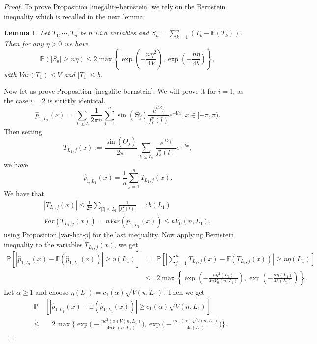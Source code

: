 \documentclass[11pt,a4paper,openany]{article}
\newtheorem{lem}[thm]{Lemma}
\def\E{\mathbb{E}}
\def \compi{\mathrm{i}}
\begin{document}
\begin{proof}
  To prove Proposition \ref{inegalite-bernstein} we rely on the Bernstein inequality which is recalled in the next lemma. 
 \begin{lem}
 \label{lemma:Berstein.inequality}
 Let $T_1, \cdots, T_n$ be $n$ i.i.d variables and $S_n = \sum_{k=1}^n (T_k - \E(T_k))$. Then for any $\eta>0$ we have
 \begin{equation}
 \mathbb{P}(|S_n| \geq n \eta) \leq 2 \max \left \{ \exp \left (-\frac{n\eta^2}{4V} \right ), \exp \left (-\frac{n\eta}{4b} \right ) \right \},
 \end{equation}
 with $Var(T_1) \leq V$ and $|T_1| \leq b$.
\end{lem}
Now let us prove Proposition \ref{inegalite-bernstein}. We will prove it for $i=1$, as the case $i=2$ is strictly identical. 
$$
\widehat p_{1, L_1}(x)= \sum_{| l| \leq L }\frac {1}{ 2 \pi n} \sum_{j=1}^n \sin(\Theta_j) \frac{e^{\compi l Z_j}}{f^\star_{\varepsilon}(l)} e^{-\compi l x}, x \in [-\pi, \pi ).
$$
Then setting
$$
T_{L_1,j}(x):= \frac{\sin(\Theta_j)}{2 \pi} \sum_{| l| \leq L_1 } \frac{e^{\compi l Z_j}}{f^\star_{\varepsilon}(l)} e^{-\compi l x},
$$
we have
$$
\widehat p_{1, L_1}(x) = \frac{1}{n} \sum_{j=1}^n T_{L_1,j}(x).
$$
We have that
\begin{eqnarray}
|T_{L_1,j}(x)| \leq \frac{1}{2\pi}  \sum_{| l| \leq L_1 } \frac{1}{|f^\star_{\varepsilon}(l)|} =: b(L_1)\\
Var (T_{L_1,j}(x)) = n Var(\widehat p_{1, L_1}(x)) \leq n V_0(n,L_1),
\end{eqnarray}
using Proposition \ref{var-hat-p} for the last inequality. Now applying Bernstein inequality to the variables $T_{L_1,j}(x)$, we get
\begin{eqnarray*}
\mathbb{P} [| \widehat p_{1, L_1}(x)- \E(\widehat p_{1, L_1}(x))| \geq \eta(L_1)] &= &\mathbb{P}  [| \sum_{j=1}^n T_{L_1, j} (x)- \E(T_{L_1, j} (x)) | \geq n \eta(L_1)] \\
&\leq & 2 \max \left \{ \exp \left (-\frac{n\eta^2(L_1)}{4nV_0(n,L_1)} \right ), \exp \left (-\frac{n\eta(L_1)}{4b(L_1)} \right ) \right \}.
\end{eqnarray*}
Let $\alpha \geq 1$ and choose $\eta(L_1)= c_1(\alpha) \sqrt{V(n,L_1)}$. Then we get 
\begin{eqnarray*}
&\mathbb{P} & [| \widehat p_{1, L_1}(x)- \E(\widehat p_{1, L_1}(x))| \geq c_1(\alpha) \sqrt{V(n,L_1) }]  \\  &\leq& \quad 2 \max \Bigg \{ \exp \Bigg (-\frac{n c_1^2(\alpha) V(n,L_1) }{4nV_0(n,L_1)} \Bigg ),  \exp \Bigg (-\frac{n c_1(\alpha) \sqrt{V(n,L_1)} }{4b(L_1)} \Bigg ) \Bigg \}.

\end{eqnarray*}
\end{proof}
\end{document}
